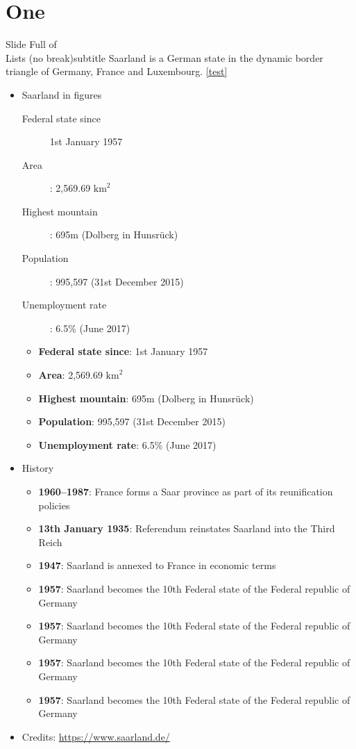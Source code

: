 \documentclass{\FormatDir corpborepresMulti}
\begin{document}
	\section{One}

	\subtitleINline
	\begin{frame}{Slide Full of\\Lists (no break)}{subtitle}
	Saarland is a German state in the dynamic border triangle of Germany, France and Luxembourg.
	\cref{test}
		\begin{itemize}
			\item Saarland in figures
				\begin{description}
					\item[Federal state since] 1st January 1957
					\item[Area]: 2,569.69 $\text{km}^2$
					\item[Highest mountain]: 695m (Dolberg in Hunsrück)
					\item[Population]: 995,597 (31st December 2015)
					\item[Unemployment rate]: 6.5\% (June 2017)
				\end{description}

				\begin{itemize}
					\item \textbf{Federal state since}: 1st January 1957
					\item \textbf{Area}: 2,569.69 $\text{km}^2$
					\item \textbf{Highest mountain}: 695m (Dolberg in Hunsrück)
					\item \textbf{Population}: 995,597 (31st December 2015)
					\item \textbf{Unemployment rate}: 6.5\% (June 2017)
				\end{itemize}
			\item History
				\begin{itemize}
					\item \textbf{1960--1987}: France forms a Saar province as part of its reunification policies
					\item \textbf{13th January 1935}: Referendum reinstates Saarland into the Third Reich
					\item \textbf{1947}: Saarland is annexed to France in economic terms
					\item \textbf{1957}: Saarland becomes the 10th Federal state of the Federal republic of Germany
					\item \textbf{1957}: Saarland becomes the 10th Federal state of the Federal republic of Germany
					\item \textbf{1957}: Saarland becomes the 10th Federal state of the Federal republic of Germany
					\item \textbf{1957}: Saarland becomes the 10th Federal state of the Federal republic of Germany
				\end{itemize}
			\item Credits: \url{https://www.saarland.de/}
		\end{itemize}
	\end{frame}
	\subtitleNEWline
\end{document}
